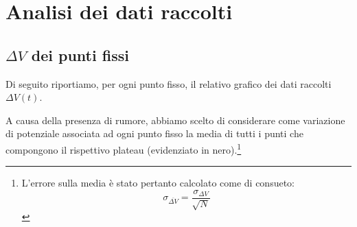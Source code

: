 \documentclass{article}
\begin{document}
\section{Analisi dei dati raccolti}
\subsection{$\Delta V$ dei punti fissi}
Di seguito riportiamo, per ogni punto fisso, il relativo
grafico dei dati raccolti $\Delta V(t)$.

A causa della presenza di rumore, abbiamo scelto di
considerare come variazione di potenziale associata
ad ogni punto fisso la media di tutti i punti che
compongono il rispettivo plateau (evidenziato in nero).\footnote{
  L'errore sulla media è stato pertanto calcolato
  come di consueto:
  \[
    \sigma_{\overline{\Delta V}} =
    \frac{\sigma_{\Delta V}}{\sqrt{N}}
  \]
}
\end{document}
